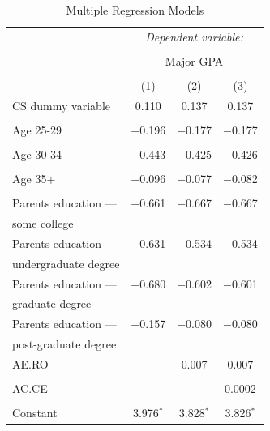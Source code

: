 \begin{table}[!htbp] \centering
  \caption{Multiple Regression Models}
  \label{tab:mr-models}
  \begin{tabular}{@{\extracolsep{5pt}}lccc}
    \toprule
     & \multicolumn{3}{c}{\textit{Dependent variable:}} \\
    \cline{2-4}
    \\[-1.8ex] & \multicolumn{3}{c}{Major GPA} \\
    \\[-1.8ex] & (1) & (2) & (3)\\
    \midrule
    CS dummy variable & 0.110 & 0.137 & 0.137 \\
    &  &  &  \\
    Age 25-29 & $-$0.196 & $-$0.177 & $-$0.177 \\
    &  &  &  \\
    Age 30-34 & $-$0.443 & $-$0.425 & $-$0.426 \\
    &  &  &  \\
    Age 35+ & $-$0.096 & $-$0.077 & $-$0.082 \\
    &  &  &  \\
    Parents education --- & $-$0.661 & $-$0.667 & $-$0.667 \\
    \hspace{2em}some college &  &  &  \\[+0.5em]
    Parents education --- & $-$0.631 & $-$0.534 & $-$0.534 \\
    \hspace{2em}undergraduate degree &  &  &  \\[+0.5em]
    Parents education --- & $-$0.680 & $-$0.602 & $-$0.601 \\
    \hspace{2em}graduate degree &  &  &  \\[+0.5em]
    Parents education --- & $-$0.157 & $-$0.080 & $-$0.080 \\
    \hspace{2em}post-graduate degree &  &  &  \\[+0.5em]
    AE.RO &  & 0.007 & 0.007 \\
    &  &  &  \\
    AC.CE &  &  & 0.0002 \\
    &  &  &  \\
    Constant & 3.976$^{*}$ & 3.828$^{*}$ & 3.826$^{*}$ \\

\end{tabular}
\end{table}
